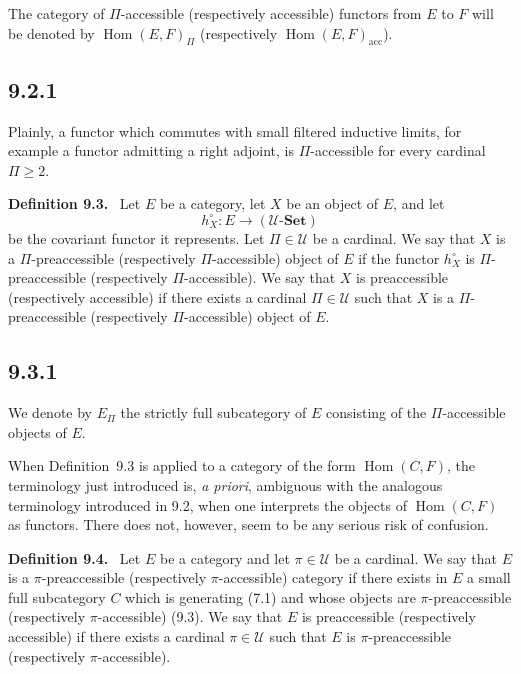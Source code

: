 \documentclass[11pt]{article}
\newcommand{\U}{\mathcal{U}}
\newcommand{\Set}{\mathbf{Set}}
\newcommand{\Hhom}{\operatorname{Hom}}
\newcommand{\acc}{\mathrm{acc}}
\newenvironment{statement}[1]{\par\medskip\noindent\textbf{#1.}\ }{\par\medskip}
\begin{document}
The category of $\Pi$-accessible (respectively accessible) functors from $E$ to $F$ will be denoted by $\Hhom(E,F)_\Pi$ (respectively $\Hhom(E,F)_{\acc}$).

\subsection*{9.2.1}
Plainly, a functor which commutes with small filtered inductive limits, for example a functor admitting a right adjoint, is $\Pi$-accessible for every cardinal $\Pi\geq 2$.

\begin{statement}{Definition 9.3}
Let $E$ be a category, let $X$ be an object of $E$, and let
\[
 h_X^\circ:E\longrightarrow (\U\text{-}\Set)
\]
be the covariant functor it represents. Let $\Pi\in\U$ be a cardinal. We say that $X$ is a $\Pi$-preaccessible (respectively $\Pi$-accessible) object of $E$ if the functor $h_X^\circ$ is $\Pi$-preaccessible (respectively $\Pi$-accessible). We say that $X$ is preaccessible (respectively accessible) if there exists a cardinal $\Pi\in\U$ such that $X$ is a $\Pi$-preaccessible (respectively $\Pi$-accessible) object of $E$.
\end{statement}

\subsection*{9.3.1}
We denote by $E_\Pi$ the strictly full subcategory of $E$ consisting of the $\Pi$-accessible objects of $E$.

When Definition~9.3 is applied to a category of the form $\Hhom(C,F)$, the terminology just introduced is, \emph{a priori}, ambiguous with the analogous terminology introduced in 9.2, when one interprets the objects of $\Hhom(C,F)$ as functors. There does not, however, seem to be any serious risk of confusion.

\begin{statement}{Definition 9.4}
Let $E$ be a category and let $\pi\in\U$ be a cardinal. We say that $E$ is a $\pi$-preaccessible (respectively $\pi$-accessible) category if there exists in $E$ a small full subcategory $C$ which is generating (7.1) and whose objects are $\pi$-preaccessible (respectively $\pi$-accessible) (9.3). We say that $E$ is preaccessible (respectively accessible) if there exists a cardinal $\pi\in\U$ such that $E$ is $\pi$-preaccessible (respectively $\pi$-accessible).
\end{statement}
\end{document}
